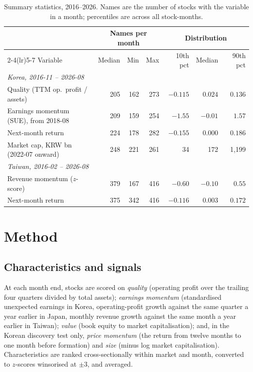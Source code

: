\documentclass[12pt,a4paper]{article}
\begin{document}
\begin{table}[!htbp]
\centering
\caption{Summary statistics, 2016--2026. Names are the number of stocks with the variable in a month; percentiles
are across all stock-months.}
\label{tab:summary}
\footnotesize
\setlength{\tabcolsep}{4.5pt}
\begin{tabular}{lrrrrrr}
\toprule
& \multicolumn{3}{c}{Names per month} & \multicolumn{3}{c}{Distribution} \\
\cmidrule(lr){2-4}\cmidrule(lr){5-7}
Variable & Median & Min & Max & 10th pct & Median & 90th pct \\
\midrule
\textit{Korea, 2016-11 -- 2026-08} \\
Quality (TTM op.\ profit / assets) & 205 & 162 & 273 & $-0.115$ & $0.024$ & $0.136$ \\
Earnings momentum (SUE), from 2018-08 & 209 & 159 & 254 & $-1.55$ & $-0.01$ & $1.57$ \\
Next-month return & 224 & 178 & 282 & $-0.155$ & $0.000$ & $0.186$ \\
Market cap, KRW bn (2022-07 onward) & 248 & 221 & 261 & 34 & 172 & 1{,}199 \\
\addlinespace
\textit{Taiwan, 2016-02 -- 2026-08} \\
Revenue momentum ($z$-score) & 379 & 167 & 416 & $-0.60$ & $-0.10$ & $0.55$ \\
Next-month return & 375 & 342 & 416 & $-0.116$ & $0.003$ & $0.172$ \\
\bottomrule
\end{tabular}
\end{table}

\section{Method}\label{sec:method}

\subsection{Characteristics and signals}

At each month end, stocks are scored on \emph{quality} (operating profit over the trailing
four quarters divided by total assets); \emph{earnings momentum} (standardised unexpected earnings in Korea,
operating-profit growth against the same quarter a year earlier in Japan, monthly revenue growth against the same month
a year earlier in Taiwan); \emph{value} (book equity to market capitalisation); and, in the Korean discovery test only,
\emph{price momentum} (the return from twelve months to one month before formation) and \emph{size} (minus log market
capitalisation). Characteristics are ranked cross-sectionally within market and month, converted to $z$-scores
winsorised at $\pm 3$, and averaged.
\end{document}

